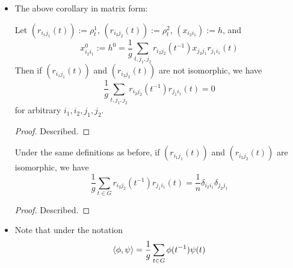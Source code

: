 \documentclass[../notes.tex]{subfiles}
\begin{document}
\begin{itemize}
\begin{corollary}
\begin{equation*}
        \end{equation*}
        with $g=|G|$. Then\dots
        \begin{enumerate}[label={\textup{(\roman*)}}]
            \item If $\rho^1$ and $\rho^2$ are not isomorphic, we have $h^0=0$;
            \item If $V_1=V_2$ and $\rho^1=\rho^2$, $h^0$ is a homothety of ratio $(1/n)\tr(h)$ with $n=\dim(V_1)$.
        \end{enumerate}
        \begin{proof}
            Given.
        \end{proof}
    \end{corollary}
    \item The above corollary in matrix form:
    \begin{corollary}\label{cly:repIsoMat1}
        Let $(r_{i_1j_1}(t)):=\rho_t^1$, $(r_{i_2j_2}(t)):=\rho_t^2$, $(x_{i_2i_1}):=h$, and
        \begin{equation*}
            x_{i_2i_1}^0 := h^0
            = \frac{1}{g}\sum_{t,j_1,j_2}r_{i_2j_2}(t^{-1})x_{j_2j_1}r_{j_1i_1}(t)
        \end{equation*}
        Then if $(r_{i_1j_1}(t))$ and $(r_{i_2j_2}(t))$ are not isomorphic, we have
        \begin{equation*}
            \frac{1}{g}\sum_{t,j_1,j_2}r_{i_2j_2}(t^{-1})r_{j_1i_1}(t) = 0
        \end{equation*}
        for arbitrary $i_1,i_2,j_1,j_2$.
        \begin{proof}
            Described.
        \end{proof}
    \end{corollary}
    \begin{corollary}\label{cly:repIsoMat2}
        Under the same definitions as before, if $(r_{i_1j_1}(t))$ and $(r_{i_2j_2}(t))$ are isomorphic, we have
        \begin{equation*}
            \frac{1}{g}\sum_{t\in G}r_{i_2j_2}(t^{-1})r_{j_1i_1}(t) = \frac{1}{n}\delta_{i_2i_1}\delta_{j_2j_1}
        \end{equation*}
        \begin{proof}
            Described.
        \end{proof}
    \end{corollary}
    \item Note that under the notation
    \begin{equation*}
        \inp{\phi,\psi} = \frac{1}{g}\sum_{t\in G}\phi(t^{-1})\psi(t)

\end{equation*}
\end{itemize}
\end{document}
